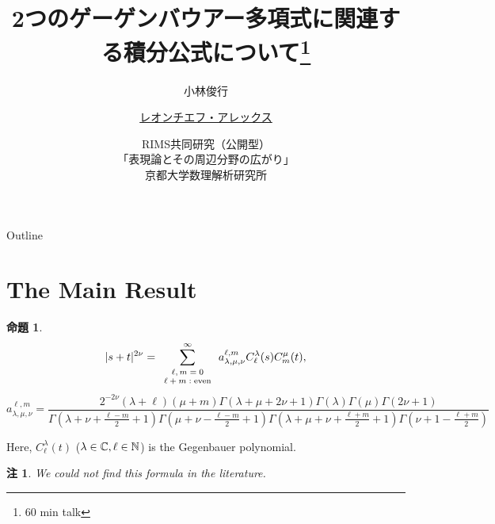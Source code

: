 \documentclass[pdf,notes]{beamer}
\title[2つのゲーゲンバウアー多項式に\dots]{2つのゲーゲンバウアー多項式に関連する積分公式について\footnote{60 min talk}}
\author[レオンチエフ・アレックス]{小林俊行\inst{1} \and \underline{レオンチエフ・アレックス}\inst{2}}
\institute[東大] %
{
  \inst{1}%
  大学院数理科学研究科、カブリ数物連携宇宙研究機構\\
  東京大学
  \and
  \inst{2}%
  大学院数理科学研究科\\
  東京大学
  }
\date[表現論とその周辺分野\dots]{RIMS共同研究（公開型）\\「表現論とその周辺分野の広がり」\\京都大学数理解析研究所}
\newcommand{\tmop}[1]{\ensuremath{\operatorname{#1}}}
\newtheorem{prop}{命題}
\newtheorem{remark}{注}
\begin{document}
\begin{frame}\titlepage\end{frame}

\begin{frame}{Outline}
	\tableofcontents
\end{frame}
\section{The Main Result}
\begin{frame}
	\begin{prop}\label{prop:exp-st-gg}
		\begin{equation}
			| s + t |^{2 \nu} = \sum_{\mbox{\scriptsize $\begin{array}[]{c}
			\ell, m = 0 \\ \ell + m : \tmop{even}
		\end{array}$}}^{\infty} a_{\lambda,\mu,\nu}^{\ell,m} C_\ell^{\lambda} (s) C_m^{\mu} (t),
			\label{eqn:exp-st-gg}
		\end{equation}
		{\scriptsize
		\begin{equation*}
	a_{\lambda,\mu,\nu}^{\ell,m}= \frac{ 2^{-2\nu}(\lambda + \ell) (\mu + m)  \Gamma (\lambda + \mu + 2 \nu + 1) \Gamma (\lambda)
  \Gamma (\mu)\Gamma \left( 2\nu +
1 \right)}{\Gamma \left( \lambda + \nu + \frac{\ell -
  m}{2} + 1 \right)  \Gamma \left( \mu + \nu -
  \frac{\ell - m}{2} + 1 \right) \Gamma \left( \lambda + \mu + \nu + \frac{\ell +
  m}{2} + 1 \right)\Gamma\left(  \nu+1-\frac{\ell+m}{2}\right)}
		\end{equation*}
	}
	\end{prop}
	Here, $C_{\ell}^\lambda(t)$ ($\lambda\in\mathbb{C},\ell\in\mathbb{N}$) is the Gegenbauer polynomial.
	\begin{remark}
		We could not find this formula in the literature.
	\end{remark}
\end{frame}
\end{document}
